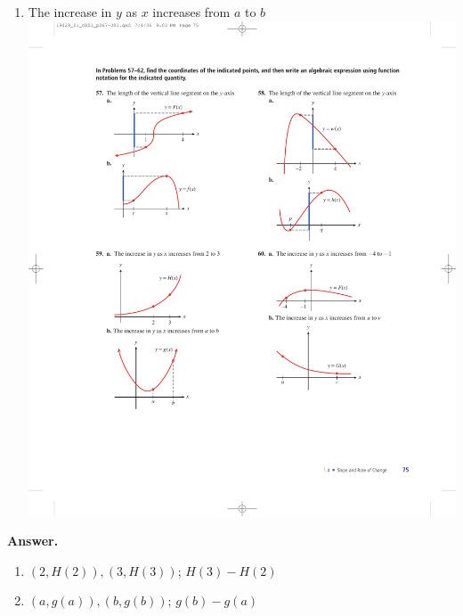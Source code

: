\documentclass[10pt,]{book}
\theoremstyle{plain}
\theoremstyle{definition}
\theoremstyle{definition}
\theoremstyle{definition}
\theoremstyle{definition}
\numberwithin{equation}{part}
\begin{document}
\begin{exercisegroup}
\begin{multicols}{2}
\begin{enumerate}[label=*\alph**]
%
\item\hypertarget{li-1079}{}The increase in \(y\) as \(x\) increases from \(a\) to \(b\) \includegraphics[width=0.8\linewidth]{images/fig-ex-1-4-59b}
%
\end{enumerate}
\end{multicols}
%
\par\smallskip
\noindent\textbf{Answer.}\hypertarget{answer-155}{}\quad
\leavevmode%
\begin{multicols}{2}
\begin{enumerate}[label=*\alph**]
\item\hypertarget{li-1080}{}\((2,H(2)),(3,H(3))\); \(H(3) - H(2)\)%
\item\hypertarget{li-1081}{}\((a,g(a)),(b,g(b))\); \(g(b) - g(a)\)%
\end{enumerate}
\end{multicols}
%
\exercise[60.]\hypertarget{exercise-275}{}\leavevmode%
\begin{multicols}{2}
\begin{enumerate}[label=*\alph**]

\end{enumerate}
\end{multicols}
\end{exercisegroup}
\end{document}
